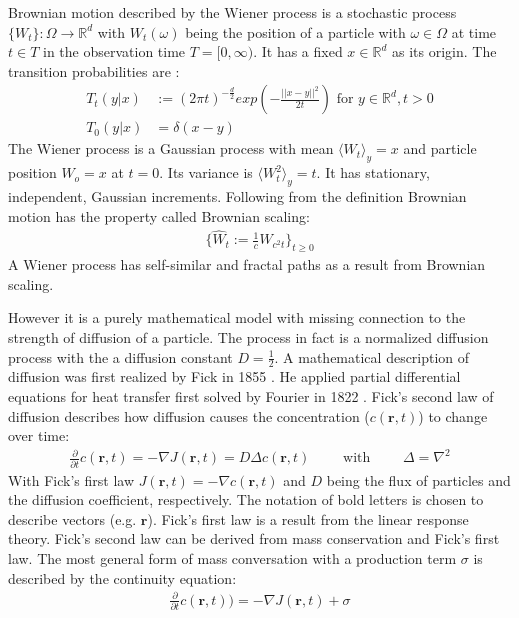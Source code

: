 \documentclass[
  a4paper,BCOR10mm,oneside,
  headsepline,footsepline,%
  fleqn,openbib
]{scrbook}
\begin{document}
Brownian motion described by the Wiener process is a stochastic process $ \{ W_t \}: \Omega \rightarrow \mathbb{R}^d$ with $ W_t(\omega)$ being the position of a particle with $\omega \in \Omega$ at time $t \in T$ in the observation time $T =[0, \infty)$. It has a fixed $x \in \mathbb{R}^d$ as its origin. The transition probabilities are \cite{LectureFelix}: 
\begin{align}
T_{t}(y|x) & := (2 \pi t)^{- \frac{d}{2}} exp \left(- \frac{||x-y||^2}{2 t}\right) \text{ for } y \in \mathbb{R}^d, t>0 \\ \nonumber
T_{0}(y|x) & = \delta(x-y) 
\end{align}
The Wiener process is a Gaussian process with mean $\langle W_t \rangle_y=x$ and particle position $W_o=x$ at $t=0$. Its variance is $\langle W^2_t \rangle_y= t$. It has stationary, independent, Gaussian increments. Following from the definition Brownian motion has the property called Brownian scaling:
\begin{align}
\label{Brownianscaling}
\{\hat{W}_t := \frac{1}{c} W_{c^2 t} \}_{t\geq0} 
\end{align}
A Wiener process has self-similar and fractal paths as a result from Brownian scaling.\par\bigskip
However it is a purely mathematical model with missing connection to the strength of diffusion of a particle. The process in fact is a normalized diffusion process with the a diffusion constant $D=\frac{1}{2}$. A mathematical description of diffusion was first realized by Fick in 1855 \cite{Fick1855}. He applied partial differential equations for heat transfer first solved by Fourier in 1822 \cite{Fourier1822}. Fick's  second law of diffusion describes how diffusion causes the concentration ($c(\bm{r},t)$) to change over time:
\begin{align}
 \frac{\partial}{\partial t} c(\bm{r},t) = - \nabla J (\bm{r},t) = D  \Delta c(\bm{r},t) \qquad \text{ with } \qquad \Delta= \nabla^2  \label{eq:ficks}
\end{align}
With Fick's first law $J(\bm{r},t)=- \nabla c(\bm{r},t)$ and $D$ being the flux of particles and the diffusion coefficient, respectively. The notation of bold letters is chosen to describe vectors (e.g. $\bm{r}$). Fick's first law is a result from the linear response theory. Fick's second law can be derived from mass conservation and Fick's first law. The most general form of mass conversation with a production term $\sigma$ is described by the continuity equation:
\begin{align}
\frac{\partial}{\partial t} c(\bm{r},t))=- \nabla J(\bm{r},t)+ \sigma 
\end{align}
\end{document}
